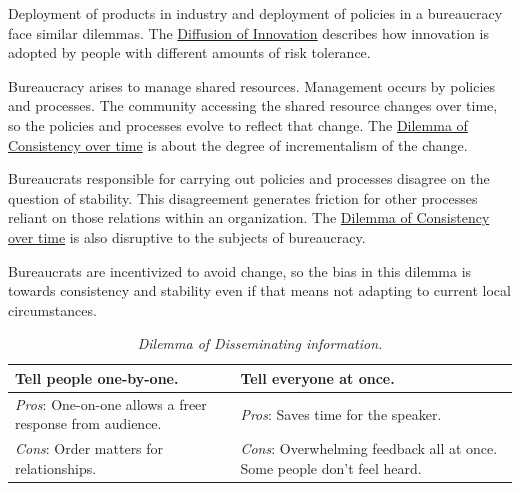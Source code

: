 Deployment of products in industry and deployment of policies in a bureaucracy face similar dilemmas. The \href{https://en.wikipedia.org/wiki/Diffusion_of_innovations}{Diffusion of Innovation} 
describes how innovation is adopted by people with different amounts of risk tolerance.

Bureaucracy arises to manage shared resources. Management occurs by policies and processes. The community accessing the shared resource changes over time, so the policies and processes evolve to reflect that change. The \href{table:consistency}{Dilemma of Consistency over time} is about the degree of incrementalism of the change.

Bureaucrats responsible for carrying out policies and processes disagree on the question of stability. This disagreement generates friction for other processes reliant on those relations within an organization.
The \href{table:consistency}{Dilemma of Consistency over time} is also disruptive to the subjects of bureaucracy. 

Bureaucrats are incentivized to avoid change, so the bias in this dilemma is towards consistency and stability even if that means not adapting to current local circumstances. 

\begin{center}
\begin{table}[H] %
\begin{tabular}{ | m{\dilemmatablewidth}| m{\dilemmatablewidth} | } 
  \hline
  \textbf{Tell people one-by-one.} & 
  \textbf{Tell everyone at once.} \\ 
  \hline
  \textit{Pros}: One-on-one allows a freer response from audience. &
  \textit{Pros}: Saves time for the speaker. \\
  \hline
  \textit{Cons}: Order matters for relationships. & 
  \textit{Cons}: Overwhelming feedback all at once. Some people don't feel heard. \\  
  \hline
\end{tabular}
\caption{
\textit{Dilemma of Disseminating information.}
}
\label{table:disseminate-one-by-one}
\end{table}
\end{center}

